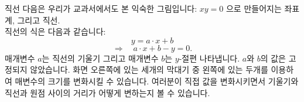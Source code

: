 \begin{surferPage}{직선}
다음은 우리가 교과서에서도 본 익숙한 그림입니다: $xy=0$ 으로 만들어지는 좌표계, 그리고 직선. \\
직선의 식은 다음과 같습니다:
\[y=a\cdot x + b\]
\[ \Rightarrow \quad a\cdot x +b -y=0.\]
매개변수 $a$는  직선의 기울기 그리고 매개변수 $b$는 $y$-절편 나타냅니다.
\newline \newline
$a$와 $b$의 값은 고정되지 않았습니다. 화면 오른쪽에 있는 세개의 막대기 중 왼쪽에 있는 두개를 이용하여 매변수의 크기를 변화시킬 수 있습니다. 여러분이 직접 값을 변화시키면서 기울기와 직선과 원점 사이의 거리가 어떻게 변하는지 볼 수 있습니다.
\end{surferPage}
